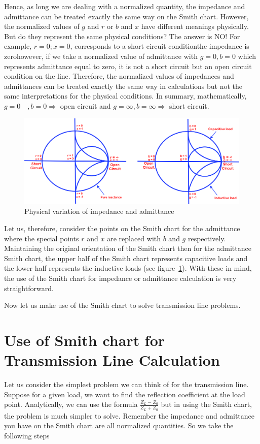 Hence, as long we are dealing with a normalized quantity, the impedance and admittance can be treated exactly the same way on the Smith chart. However, the normalized values of $g$ and $r$ or $b$ and $x$ have different meanings physically. But do they represent the same physical conditions? The answer is NO! For example, $r = 0; x = 0$, corresponds to a short circuit condition\textemdash\;the impedance is zero\textemdash\;however, if we take a normalized value of admittance with $g=0, b=0$ which represents admittance equal to zero, it is not a short circuit but an open circuit condition on the line. Therefore, the normalized values of impedances and admittances can be treated exactly the same way in calculations but not the same interpretations for the physical conditions. In summary, mathematically, $g = 0\quad, b = 0\Longrightarrow$ open circuit and $g = \infty, b = \infty \Longrightarrow$ short circuit. 
\begin{figure}[h]
\centering
\includegraphics[width=1\linewidth]{graphics/jnbkvfld}
\caption{Physical variation of impedance and admittance}
\label{fig:jnbkvfld}
\end{figure}

Let us, therefore, consider the points on the Smith chart for the admittance where the special points $r$ and $x$ are replaced with $b$ and $g$ respectively. Maintaining the original orientation of the Smith chart then for the admittance Smith chart, the upper half of the Smith chart represents capacitive loads and the lower half represents the inductive loads (see figure~\ref{fig:jnbkvfld}). With these in mind, the use of the Smith chart for impedance or admittance calculation is very straightforward.

Now let us make use of the Smith chart to solve transmission line problems. 

\section{Use of Smith chart for Transmission Line Calculation}
Let us consider the simplest problem we can think of for the transmission line. Suppose for a given load, we want to find the reflection coefficient at the load point. Analytically, we can use the formula $\frac{Z_L - Z_0}{Z_L + Z_0}$ but in using the Smith chart, the problem is much simpler to solve. Remember the impedance and admittance you have on the Smith chart are all normalized quantities. So we take the following steps

